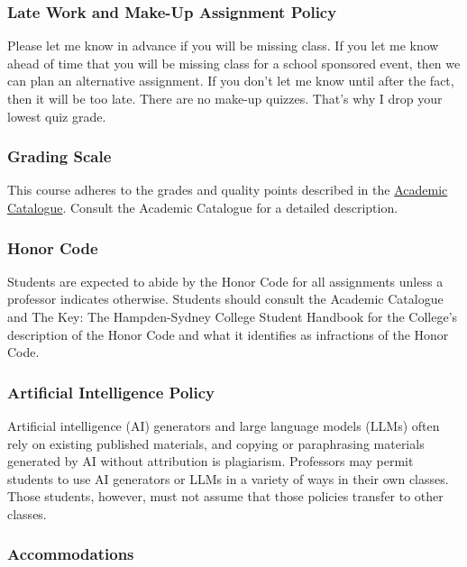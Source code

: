 \documentclass[10pt]{article}
\begin{document}
\subsubsection*{Late Work and Make-Up Assignment Policy}

Please let me know in advance if you will be missing class. If you let me know ahead of time that you will be missing class for a school sponsored event, then we can plan an alternative assignment. If you don't let me know until after the fact, then it will be too late.  There are no make-up quizzes.  That's why I drop your lowest quiz grade. 

\subsubsection*{Grading Scale} 

This course adheres to the grades and quality points described in the \href{https://www.hsc.edu/academic-catalogues}{Academic Catalogue}. Consult the Academic Catalogue for a detailed description. 


\subsubsection*{Honor Code}

Students are expected to abide by the Honor Code for all assignments unless a professor indicates otherwise. Students should consult the Academic Catalogue and The Key: The Hampden-Sydney College Student Handbook for the College’s description of the Honor Code and what it identifies as infractions of the Honor Code.

\subsubsection*{Artificial Intelligence Policy}

Artificial intelligence (AI) generators and large language models (LLMs) often rely on existing published materials, and copying or paraphrasing materials generated by AI without attribution is plagiarism. Professors may permit students to use AI generators or LLMs in a variety of ways in their own classes. Those students, however, must not assume that those policies transfer to other classes.

\subsubsection*{Accommodations}
\end{document}
